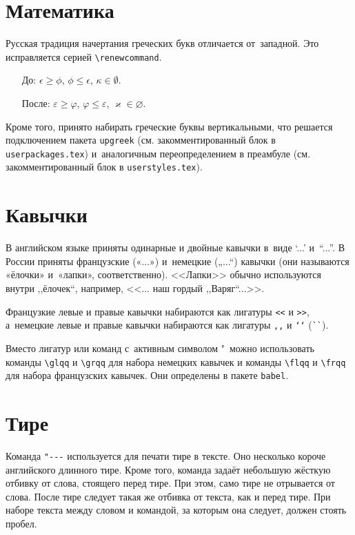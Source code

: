 \section{Математика}

Русская традиция начертания греческих букв отличается от~западной. Это исправляется серией \verb|\renewcommand|.
\begin{itemize}
    \item[До:] $ \epsilon \ge \phi$, $\phi \leq \epsilon$, $\kappa \in \emptyset$.
    \renewcommand{\epsilon}{\ensuremath{\varepsilon}}
    \renewcommand{\phi}{\ensuremath{\varphi}}
    \renewcommand{\kappa}{\ensuremath{\varkappa}}
    \renewcommand{\le}{\ensuremath{\leqslant}}
    \renewcommand{\leq}{\ensuremath{\leqslant}}
    \renewcommand{\ge}{\ensuremath{\geqslant}}
    \renewcommand{\geq}{\ensuremath{\geqslant}}
    \renewcommand{\emptyset}{\varnothing}
    \item[После:] $\epsilon \ge \phi$, $\phi \leq \epsilon$, $\kappa \in \emptyset$.
\end{itemize}

Кроме того, принято набирать греческие буквы вертикальными, что решается подключением пакета \verb|upgreek| (см. закомментированный блок в \verb|userpackages.tex|) и~аналогичным переопределением в преамбуле (см. закомментированный блок в \verb|userstyles.tex|).


\section{Кавычки}
В английском языке приняты одинарные и двойные кавычки в~виде ‘...’ и~“...”. В России приняты французские («...») и~немецкие („...“) кавычки (они называются «ёлочки» и~«лапки», соответственно). <<Лапки>> обычно используются внутри ,,ёлочек``, например, <<... наш гордый ,,Варяг``...>>.

Французкие левые и правые кавычки набираются
как лигатуры \verb|<<| и \verb|>>|, а~немецкие левые и правые кавычки набираются как лигатуры \verb|,,| и \verb|‘‘| (\verb|``|).

Вместо лигатур или команд с~активным символом "\ можно использовать команды \verb|\glqq| и \verb|\grqq| для набора немецких кавычек и команды \verb|\flqq| и \verb|\frqq| для набора французских кавычек. Они определены в пакете \verb|babel|.

\section{Тире}
Команда \verb|"---| используется для печати тире в тексте. Оно несколько короче английского длинного тире. Кроме того, команда задаёт небольшую жёсткую отбивку от слова, стоящего перед тире. При этом, само тире не отрывается от слова. После тире следует такая же отбивка от текста, как и перед тире. При наборе текста между словом и командой, за которым она следует, должен стоять пробел.

